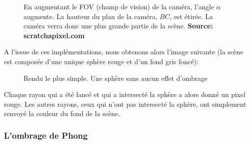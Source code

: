 \documentclass[11pt]{article}
\begin{document}
\begin{figure}[h!]

	\caption{En augmentant le FOV (champ de vision) de la caméra, l'angle $\alpha$ augmente. La hauteur du plan de la caméra, $BC$, est étirée. La caméra verra donc une plus grande partie de la scène. \textbf{Source: scratchapixel.com}}
	\label{fovCam}
\end{figure}
\FloatBarrier

A l'issue de ces implémentations, nous obtenons alors l'image suivante (la scène est composée d'une unique sphère rouge et d'un fond gris foncé):

\begin{figure}[h!]

	\caption{Rendu le plus simple. Une sphère sans aucun effet d'ombrage}
	\label{basicRender}
\end{figure}
\FloatBarrier

Chaque rayon qui a été lancé et qui a intersecté la sphère a alors donné un pixel rouge. Les autres rayons, ceux qui n'ont pas intersecté la sphère, ont simplement renvoyé la couleur du fond de la scène. 

\subsubsection{L'ombrage de Phong}
\label{ombragePhong}
\end{document}
